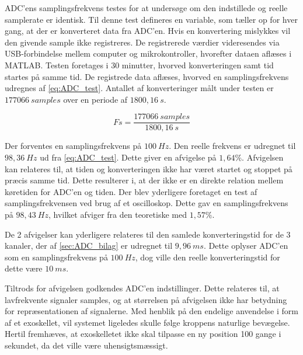 
ADC'ens samplingsfrekvens testes for at undersøge om den indstillede og reelle samplerate er identisk. Til denne test defineres en variable, som tæller op for hver gang, at der er konverteret data fra ADC'en. Hvis en konvertering mislykkes vil den givende sample ikke registreres. De registrerede værdier videresendes via USB-forbindelse mellem computer og mikrokontroller, hvorefter dataen aflæses i MATLAB. 
Testen foretages i 30 minutter, hvorved konverteringen samt tid startes på samme tid. De registrede data aflæses, hvorved en samplingsfrekvens udregnes af \autoref{eq:ADC_test}. Antallet af konverteringer målt under testen er $177066~samples$ over en periode af $1800,16~s$.

\begin{equation}\label{eq:ADC_test}
Fs = \frac{177066~samples}{1800,16~s}
\end{equation}

\noindent
Der forventes en samplingsfrekvens på $100~Hz$. Den reelle frekvens er udregnet til $98,36~Hz$ ud fra \autoref{eq:ADC_test}. Dette giver en afvigelse på $1,64\%$. Afvigelsen kan relateres til, at tiden og konverteringen ikke har været startet og stoppet på præcis samme tid. Dette resulterer i, at der ikke er en direkte relation mellem køretiden for ADC'en og tiden. Der blev yderligere foretaget en test af samplingsfrekvensen ved brug af et oscilloskop. Dette gav en samplingsfrekvens på $98,43~Hz$, hvilket afviger fra den teoretiske med $1,57\%$. 

De 2 afvigelser kan yderligere relateres til den samlede konverteringstid for de 3 kanaler, der af \autoref{sec:ADC_bilag} er udregnet til $9,96~ms$. Dette oplyser ADC'en som en samplingsfrekvens på $100~Hz$, dog ville den reelle konverteringstid for dette være $10~ms$. 


Tiltrods for afvigelsen godkendes ADC'en indstillinger. Dette relateres til, at lavfrekvente signaler samples, og at størrelsen på afvigelsen ikke har betydning for repræsentationen af signalerne. 
Med henblik på den endelige anvendelse i form af et exoskellet, vil systemet ligeledes skulle følge kroppens naturlige bevægelse. Hertil fremhæves, at exoskelletet ikke skal tilpasse en ny position 100 gange i sekundet, da det ville være uhensigtsmæssigt.


